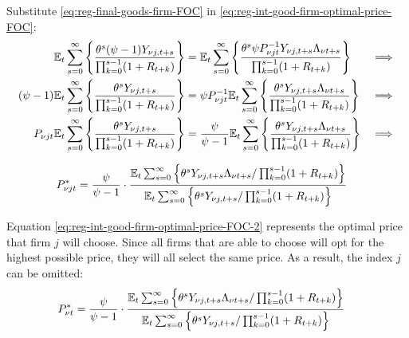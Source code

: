 \documentclass[
thesis.tex
]{subfiles}
\begin{document}

Substitute \ref{eq:reg-final-goods-firm-FOC} in \ref{eq:reg-int-good-firm-optimal-price-FOC}:
\begin{alignat}{2}
	{\mathbb{E}_{t}} \sum_{s=0}^{\infty} \Bigg\{ \frac{\theta^s (\psi-1) Y_{\nu j,t+s}}{\prod_{k=0}^{s-1}(1+R_{t+k})} \Bigg\} &= {\mathbb{E}_{t}} \sum_{s=0}^{\infty} \Bigg\{ \frac{\theta^s \psi P_{\nu jt}^{-1} Y_{\nu j,t+s} \Lambda_{\nu t+s}}{\prod_{k=0}^{s-1}(1+R_{t+k})}  \Bigg\} &\implies \nonumber \\
	(\psi-1) {\mathbb{E}_{t}} \sum_{s=0}^{\infty} \Bigg\{ \frac{\theta^s Y_{\nu j,t+s}}{\prod_{k=0}^{s-1}(1+R_{t+k})} \Bigg\} &= \psi P_{\nu jt}^{-1} {\mathbb{E}_{t}} \sum_{s=0}^{\infty} \Bigg\{ \frac{\theta^s Y_{\nu j,t+s} \Lambda_{\nu t+s}}{\prod_{k=0}^{s-1}(1+R_{t+k})}  \Bigg\} &\implies \nonumber \\
	P_{\nu jt} {\mathbb{E}_{t}} \sum_{s=0}^{\infty} \Bigg\{ \frac{\theta^s Y_{\nu j,t+s}}{\prod_{k=0}^{s-1}(1+R_{t+k})} \Bigg\} &= \frac{\psi}{\psi-1} {\mathbb{E}_{t}} \sum_{s=0}^{\infty} \Bigg\{ \frac{\theta^s Y_{\nu j,t+s} \Lambda_{\nu t+s}}{\prod_{k=0}^{s-1}(1+R_{t+k})}  \Bigg\} &\implies \nonumber
\end{alignat}

\vspace*{-1cm}

\begin{align}
	\label{eq:reg-int-good-firm-optimal-price-FOC-2}
	P_{\nu jt}^\ast &= 
	\frac{\psi}{\psi-1} \cdot
	\frac{
		{\mathbb{E}_{t}} \sum_{s=0}^{\infty} \left\{ 
		\theta^s Y_{\nu j,t+s} \Lambda_{\nu t+s} / \prod_{k=0}^{s-1}(1+R_{t+k}) \right\} } {{\mathbb{E}_{t}} \sum_{s=0}^{\infty} \left\{
		\theta^s Y_{\nu j,t+s} / \prod_{k=0}^{s-1}(1+R_{t+k}) \right\}}
\end{align}


Equation \ref{eq:reg-int-good-firm-optimal-price-FOC-2} represents the optimal price that firm $j$ will choose. Since all firms that are able to choose will opt for the highest possible price, they will all select the same price. As a result, the index $j$ can be omitted:
\begin{align}
	\label{eq:reg-int-good-firm-optimal-price-FOC-3}
	P_{\nu t}^\ast &= 
	\frac{\psi}{\psi-1} \cdot
	\frac{
		{\mathbb{E}_{t}} \sum_{s=0}^{\infty} \left\{ 
		\theta^s Y_{\nu j,t+s} \Lambda_{\nu t+s} / \prod_{k=0}^{s-1}(1+R_{t+k}) \right\} } {{\mathbb{E}_{t}} \sum_{s=0}^{\infty} \left\{
		\theta^s Y_{\nu j,t+s} / \prod_{k=0}^{s-1}(1+R_{t+k}) \right\}}
\end{align}

\end{document}
